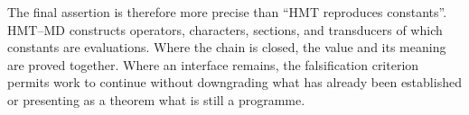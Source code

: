 The final assertion is therefore more precise than ``HMT reproduces
constants''. HMT--MD constructs operators, characters, sections, and
transducers of which constants are evaluations. Where the chain
is closed, the value and its meaning are proved together. Where an
interface remains, the falsification criterion permits work to continue without downgrading what has already been established or
presenting as a theorem what is still a programme.
